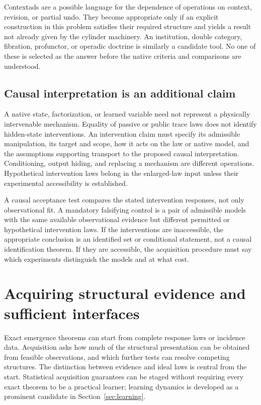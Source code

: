 \documentclass[11pt]{article}
\theoremstyle{remark}
\begin{document}
Contextads are a possible language for the dependence of operations on context, revision, or partial undo. They become appropriate only if an explicit construction in this problem satisfies their required structure and yields a result not already given by the cylinder machinery. An institution, double category, fibration, profunctor, or operadic doctrine is similarly a candidate tool. No one of these is selected as the answer before the native criteria and comparisons are understood.

\subsection{Causal interpretation is an additional claim}

A native state, factorization, or learned variable need not represent a physically intervenable mechanism. Equality of passive or public trace laws does not identify hidden-state interventions. An intervention claim must specify its admissible manipulation, its target and scope, how it acts on the law or native model, and the assumptions supporting transport to the proposed causal interpretation. Conditioning, output hiding, and replacing a mechanism are different operations. Hypothetical intervention laws belong in the enlarged-law input unless their experimental accessibility is established.

A causal acceptance test compares the stated intervention responses, not only observational fit. A mandatory falsifying control is a pair of admissible models with the same available observational evidence but different permitted or hypothetical intervention laws. If the interventions are inaccessible, the appropriate conclusion is an identified set or conditional statement, not a causal identification theorem. If they are accessible, the acquisition procedure must say which experiments distinguish the models and at what cost.

\section{Acquiring structural evidence and sufficient interfaces}
\label{sec:acquisition}

Exact emergence theorems can start from complete response laws or incidence data. Acquisition asks how much of the structural presentation can be obtained from feasible observations, and which further tests can resolve competing structures. The distinction between evidence and ideal laws is central from the start. Statistical acquisition guarantees can be staged without requiring every exact theorem to be a practical learner; learning dynamics is developed as a prominent candidate in Section~\ref{sec:learning}.
\end{document}
